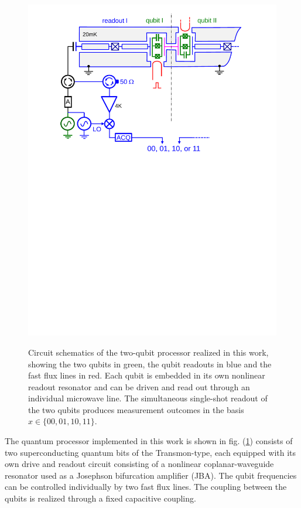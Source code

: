 \begin{figure}
	\centering
		\includegraphics[width=1.\textwidth]{./material/papers/grover/figures/2_qubit_processor_schematic}
	\label{fig:two_qubit_processor_schematic}
	\caption{Circuit schematics of the two-qubit processor realized in this work, showing the two qubits in green, the qubit readouts in blue and the fast flux lines in red. Each qubit is embedded in its own nonlinear readout resonator and can be driven and read out through an individual microwave line. The simultaneous single-shot readout of the two qubits produces measurement outcomes in the basis $x \in \{00,01,10,11\}$.}
\end{figure}

The quantum processor implemented in this work is shown in fig. (\ref{fig:two_qubit_processor_schematic}) consists of two superconducting quantum bits of the Transmon-type, each equipped with its own drive and readout circuit consisting of a nonlinear coplanar-waveguide resonator used as a Josephson bifurcation amplifier (JBA). The qubit frequencies can be controlled individually by two fast flux lines. The coupling between the qubits is realized through a fixed capacitive coupling.

